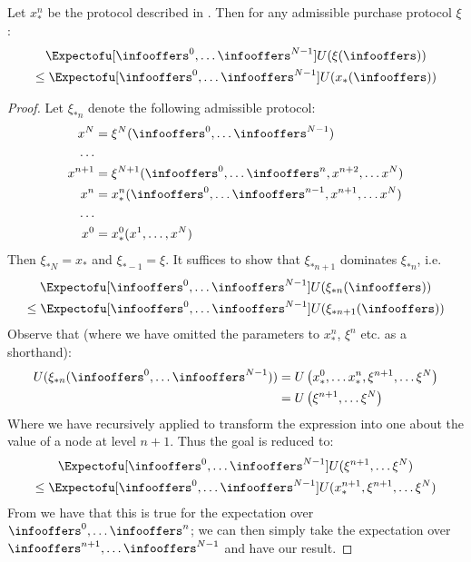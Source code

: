 \begin{theorem}
  Let $x^n_*$ be the protocol described in . Then for any admissible purchase protocol $\xi$:
  \begin{multline*}
    \Expectofu[\infooffers^0,\dots\infooffers^{N-1}]{U(\xi(\infooffers))} \\
    \le \Expectofu[\infooffers^0,\dots\infooffers^{N-1}]{U(x_*(\infooffers))}
  \end{multline*}
  \label{infonomy:thm:exa}
\end{theorem}
\begin{proof}
Let $\xi_{*n}$ denote the following admissible protocol:
  \begin{align*}
    x^N &= \xi^N(\infooffers^0,\dots\infooffers^{N-1}) \\
    \dots&\\
    x^{n+1} &= \xi^{N+1}(\infooffers^0,\dots\infooffers^{n},x^{n+2},\dots x^N)\\
    x^n &= x_*^n(\infooffers^0,\dots\infooffers^{n-1}, x^{n+1},\dots x^N) \\
    \dots&\\
    x^0 &= x_*^0(x^1,\dots, x^N) \\
  \end{align*}
  Then $\xi_{*N}=x_*$ and $\xi_{*-1}=\xi$. It suffices to show that $\xi_{*n+1}$ dominates $\xi_{*n}$, i.e.
  \begin{multline*}
    \Expectofu[\infooffers^0,\dots\infooffers^{N-1}]{U(\xi_{*n}(\infooffers))} \\
    \le \Expectofu[\infooffers^0,\dots\infooffers^{N-1}]{U(\xi_{*n+1}(\infooffers))}
  \end{multline*}
  Observe that (where we have omitted the parameters to $x^n_*$, $\xi^n$ etc. as a shorthand):
  \begin{align*}
  U(\xi_{*n}(\infooffers^0,\dots\infooffers^{N-1})) &= U\left(
    x^0_*, \dots x^n_*,\xi^{n+1},\dots\xi^N
  \right) \\
  &= U\left(\xi^{n+1},\dots\xi^N\right)
  \end{align*}
  Where we have recursively applied  to transform the expression into one about the value of a node at level $n+1$. Thus the goal is reduced to:
  \begin{multline*}
    \Expectofu[\infooffers^0,\dots\infooffers^{N-1}]{U(\xi^{n+1},\dots \xi^N)} \\
    \le \Expectofu[\infooffers^0,\dots\infooffers^{N-1}]{U(x_*^{n+1}, \xi^{n+1},\dots \xi^N)}
  \end{multline*}
  From  we have that this is true for the expectation over $\infooffers^0,\dots\infooffers^{n}$; we can then simply take the expectation over $\infooffers^{n+1},\dots\infooffers^{N-1}$ and have our result.
\end{proof}

